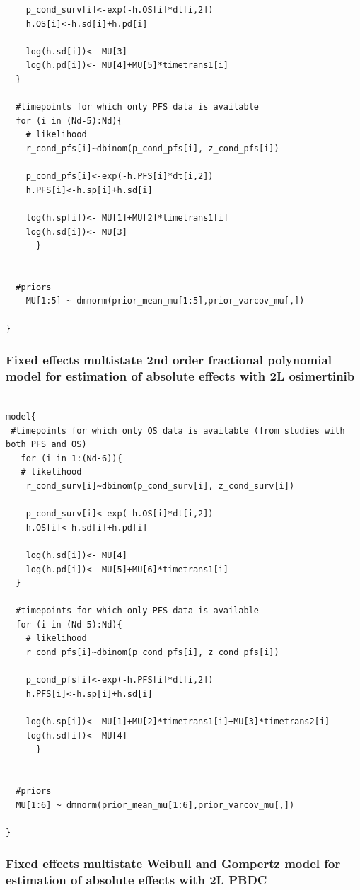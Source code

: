 \documentclass[11pt,final,fleqn]{article}\usepackage[]{graphicx}\usepackage[]{color}
\theoremstyle{plain}
\begin{document}
\begin{appendices}
\begin{verbatim}
    p_cond_surv[i]<-exp(-h.OS[i]*dt[i,2])
    h.OS[i]<-h.sd[i]+h.pd[i]
    
    log(h.sd[i])<- MU[3] 
    log(h.pd[i])<- MU[4]+MU[5]*timetrans1[i]
  }
    
  #timepoints for which only PFS data is available 
  for (i in (Nd-5):Nd){
    # likelihood
    r_cond_pfs[i]~dbinom(p_cond_pfs[i], z_cond_pfs[i]) 
    
    p_cond_pfs[i]<-exp(-h.PFS[i]*dt[i,2])
    h.PFS[i]<-h.sp[i]+h.sd[i]
    
    log(h.sp[i])<- MU[1]+MU[2]*timetrans1[i]
    log(h.sd[i])<- MU[3] 
      }
  
  
  #priors
    MU[1:5] ~ dmnorm(prior_mean_mu[1:5],prior_varcov_mu[,]) 
  
}

\end{verbatim}

\subsubsection{Fixed effects multistate 2nd order fractional polynomial model for estimation of absolute effects with 2L osimertinib} 
\begin{verbatim} 

model{
 #timepoints for which only OS data is available (from studies with both PFS and OS)
   for (i in 1:(Nd-6)){
   # likelihood
    r_cond_surv[i]~dbinom(p_cond_surv[i], z_cond_surv[i]) 
    
    p_cond_surv[i]<-exp(-h.OS[i]*dt[i,2])
    h.OS[i]<-h.sd[i]+h.pd[i]
    
    log(h.sd[i])<- MU[4] 
    log(h.pd[i])<- MU[5]+MU[6]*timetrans1[i]
  }
    
  #timepoints for which only PFS data is available 
  for (i in (Nd-5):Nd){
    # likelihood
    r_cond_pfs[i]~dbinom(p_cond_pfs[i], z_cond_pfs[i]) 
    
    p_cond_pfs[i]<-exp(-h.PFS[i]*dt[i,2])
    h.PFS[i]<-h.sp[i]+h.sd[i]
    
    log(h.sp[i])<- MU[1]+MU[2]*timetrans1[i]+MU[3]*timetrans2[i] 
    log(h.sd[i])<- MU[4] 
      }
  
 
  #priors
  MU[1:6] ~ dmnorm(prior_mean_mu[1:6],prior_varcov_mu[,]) 
  
}

\end{verbatim}

\subsubsection{Fixed effects multistate Weibull and Gompertz model for estimation of absolute effects with 2L PBDC} 
\begin{verbatim} 


\end{verbatim}
\end{appendices}
\end{document}

